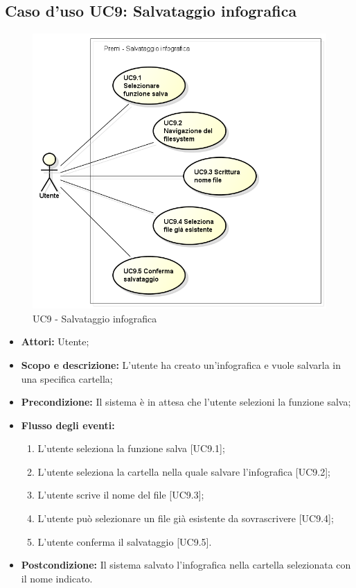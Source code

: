 \subsection{Caso d'uso UC9: Salvataggio infografica}
\begin{figure}[h] 
	\centering 
	\includegraphics[scale=0.45] {img/UC9.png} 
	\caption{UC9 - Salvataggio infografica} 
\end{figure}

\begin{itemize}
	\item \textbf{Attori:} Utente;
	\item \textbf{Scopo e descrizione:} L'utente ha creato un'\gls{infografica} e vuole salvarla in una specifica cartella;
	\item \textbf{Precondizione:} Il sistema è in attesa che l'utente selezioni la funzione salva;
	\item \textbf{Flusso degli eventi:}
	\begin{enumerate}
		\item L'utente seleziona la funzione salva [UC9.1];
		\item L'utente seleziona la cartella nella quale salvare l'\gls{infografica} [UC9.2];
		\item L'utente scrive il nome del file [UC9.3];
		\item L'utente può selezionare un file già esistente da sovrascrivere [UC9.4];
		\item L'utente conferma il salvataggio [UC9.5].
	\end{enumerate}
	\item \textbf{Postcondizione:} Il sistema salvato l'\gls{infografica} nella cartella selezionata con il nome indicato.
\end{itemize}

